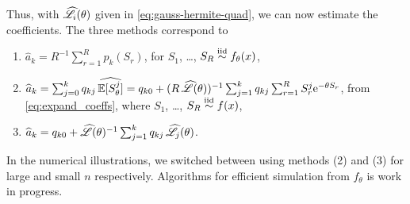 \begin{subappendices}
Thus, with $\widehat{\mathscr{L}}_i(\theta)$ given in \eqref{eq:gauss-hermite-quad}, we can now estimate the coefficients. The three methods correspond to
\begin{enumerate}
\item $\widehat{a}_k = R^{-1} \sum_{r=1}^R p_k(S_r)$, for $S_1$, \dots, $S_R \overset{\smash{\mathrm{iid}}}{\sim} f_\theta(x)$,
\item $\widehat{a}_k = \sum_{j=0}^k q_{kj} \, \widehat{\operatorname{{\mathbb E}}[S_\theta^j]} = q_{k0} + (R \, \widehat{\mathscr{L}}(\theta))^{-1} \sum_{j=1}^k q_{kj} \sum_{r=1}^R S_r^j \mathrm{e}^{-\theta S_r}$, from \eqref{eq:expand_coeffs}, where $S_1$, \dots, $S_R \overset{\smash{\mathrm{iid}}}{\sim} f(x)$,
\item $\widehat{a}_k = q_{k0} + \widehat{\mathscr{L}}(\theta)^{-1} \sum_{j=1}^k q_{kj} \, \widehat{\mathscr{L}}_j(\theta)$.
\end{enumerate}
In the numerical illustrations, we switched between using methods (2) and (3) for large and small $n$ respectively. Algorithms for efficient simulation from $f_\theta$ is work in progress.


\end{subappendices}